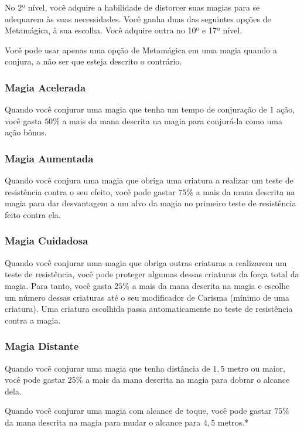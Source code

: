 \documentclass{RPG_Adventure}[2021/10/20]
\begin{document}
\begin{multicols}{2}
No 2º nível, você adquire a habilidade de distorcer suas magias para se
adequarem às suas necessidades. Você ganha duas das seguintes opções de
Metamágica, à sua escolha. Você adquire outra no 10º e 17º nível.

Você pode usar apenas uma opção de Metamágica em uma magia quando a conjura, a
não ser que esteja descrito o contrário.

\subsubsection*{Magia Acelerada}%

Quando você conjurar uma magia que tenha um tempo de conjuração de 1 ação, você
gasta $50\%$ a mais da mana descrita na magia para conjurá-la como uma ação
bônus.

\subsubsection*{Magia Aumentada}%

Quando você conjura uma magia que obriga uma criatura a realizar um teste de
resistência contra o seu efeito, você pode gastar $75\%$ a mais da mana descrita
na magia para dar desvantagem a um alvo da magia no primeiro teste de
resistência feito contra ela.

\subsubsection*{Magia Cuidadosa}%

Quando você conjurar uma magia que obriga outras criaturas a realizarem um teste
de resistência, você pode proteger algumas dessas criaturas da força total da
magia. Para tanto, você gasta $25\%$ a mais da mana descrita na magia e escolhe
um número dessas criaturas até o seu modificador de Carisma (mínimo de uma
criatura). Uma criatura escolhida passa automaticamente no teste de resistência
contra a magia.

\subsubsection*{Magia Distante}%

Quando você conjurar uma magia que tenha distância de $1,5$ metro ou maior, você
pode gastar $25\%$ a mais da mana descrita na magia para dobrar o alcance dela.

Quando você conjurar uma magia com alcance de toque, você pode gastar $75\%$ da
mana descrita na magia para mudar o alcance para $4,5$ metros.*


\end{multicols}
\end{document}
